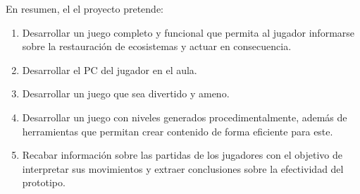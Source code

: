En resumen, el el proyecto pretende:
\begin{enumerate}
    \item Desarrollar un juego completo y funcional que permita al jugador informarse sobre la restauración de ecosistemas y actuar en consecuencia.
    \item Desarrollar el PC del jugador en el aula.
    \item Desarrollar un juego que sea divertido y ameno.
    \item Desarrollar un juego con niveles generados procedimentalmente, además de herramientas que permitan crear contenido de forma eficiente para este.
    \item Recabar información sobre las partidas de los jugadores con el objetivo de interpretar sus movimientos y extraer conclusiones sobre la efectividad del prototipo.
\end{enumerate}